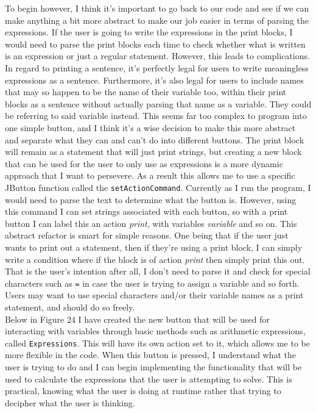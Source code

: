 \documentclass[a4paper, 12pt]{article}
\begin{document}
            To begin however, I think it's important to go back to our code and see if we can make anything
            a bit more abstract to make our job easier in terms of parsing the expressions. If the user is
            going to write the expressions in the print blocks, I would need to parse the print blocks each
            time to check whether what is written is an expression or just a regular statement. However,
            this leads to complications. In regard to printing a sentence, it's perfectly legal for
            users to write meaningless expressions as a sentence. Furthermore, it's also legal for users
            to include names that may so happen to be the name of their variable too, within their print
            blocks as a sentence without actually parsing that name as a variable. They could be referring
            to said variable instead. This seems far too complex to program into one simple button, and
            I think it's a wise decision to make this more abstract and separate what they can and can't do
            into different buttons. The print block will remain as a statement that will just print strings,
            but creating a new block that can be used for the user to only use as expressions is a more
            dynamic approach that I want to persevere. As a result this allows me to use a specific JButton
            function called the \texttt{setActionCommand}. Currently as I run the program, I would need to
            parse the text to determine what the button is. However, using this command I can set strings
            associated with each button, so with a print button I can label this an action \textit{print},
            with variables \textit{variable} and so on. This abstract refactor is smart for simple reasons.
            One being that if the user just wants to print out a statement, then if they're using a print
            block, I can simply write a condition where if the block is of action \textit{print} then simply
            print this out. That is the user's intention after all, I don't need to parse it and check for
            special characters such as \texttt{=} in case the user is trying to assign a variable and so forth.
            Users may want to use special characters and/or their variable names as a print statement, and
            should do so freely. \\

            Below in Figure 24 I have created the new button that will be used for interacting with variables
            through basic methods such as arithmetic expressions, called \texttt{Expressions}. This will
            have its own action set to it, which allows me to be more flexible in the code. When this
            button is pressed, I understand what the user is trying to do and I can begin implementing the
            functionality that will be used to calculate the expressions that the user is attempting to
            solve. This is practical, knowing what the user is doing at runtime rather that trying to
            decipher what the user is thinking.
            
\end{document}

